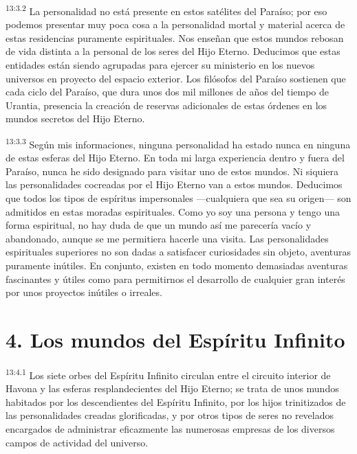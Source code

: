 \par
\textsuperscript{13:3.2} La personalidad no está presente en estos satélites del Paraíso; por eso podemos presentar muy poca cosa a la personalidad mortal y material acerca de estas residencias puramente espirituales. Nos enseñan que estos mundos rebosan de vida distinta a la personal de los seres del Hijo Eterno. Deducimos que estas entidades están siendo agrupadas para ejercer su ministerio en los nuevos universos en proyecto del espacio exterior. Los filósofos del Paraíso sostienen que cada ciclo del Paraíso, que dura unos dos mil millones de años del tiempo de Urantia, presencia la creación de reservas adicionales de estas órdenes en los mundos secretos del Hijo Eterno.

\par
\textsuperscript{13:3.3} Según mis informaciones, ninguna personalidad ha estado nunca en ninguna de estas esferas del Hijo Eterno. En toda mi larga experiencia dentro y fuera del Paraíso, nunca he sido designado para visitar uno de estos mundos. Ni siquiera las personalidades cocreadas por el Hijo Eterno van a estos mundos. Deducimos que todos los tipos de espíritus impersonales ---cualquiera que sea su origen--- son admitidos en estas moradas espirituales. Como yo soy una persona y tengo una forma espiritual, no hay duda de que un mundo así me parecería vacío y abandonado, aunque se me permitiera hacerle una visita. Las personalidades espirituales superiores no son dadas a satisfacer curiosidades sin objeto, aventuras puramente inútiles. En conjunto, existen en todo momento demasiadas aventuras fascinantes y útiles como para permitirnos el desarrollo de cualquier gran interés por unos proyectos inútiles o irreales.

\section*{4. Los mundos del Espíritu Infinito}
\par
\textsuperscript{13:4.1} Los siete orbes del Espíritu Infinito circulan entre el circuito interior de Havona y las esferas resplandecientes del Hijo Eterno; se trata de unos mundos habitados por los descendientes del Espíritu Infinito, por los hijos trinitizados de las personalidades creadas glorificadas, y por otros tipos de seres no revelados encargados de administrar eficazmente las numerosas empresas de los diversos campos de actividad del universo.


